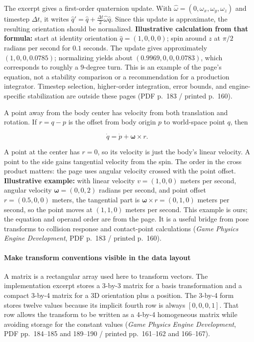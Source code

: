 The excerpt gives a first-order quaternion update. With \(\hat{\omega}=(0,\omega_x,\omega_y,\omega_z)\) and timestep \(\Delta t\), it writes \(\hat q' = \hat q + \frac{\Delta t}{2}\hat{\omega}\hat q\). Since this update is approximate, the resulting orientation should be normalized. \textbf{Illustrative calculation from that formula:} start at identity orientation \(\hat q=(1,0,0,0)\); spin around \(z\) at \(\pi/2\) radians per second for \(0.1\) seconds. The update gives approximately \((1,0,0,0.0785)\); normalizing yields about \((0.9969,0,0,0.0783)\), which corresponds to roughly a 9-degree turn. This is an example of the page's equation, not a stability comparison or a recommendation for a production integrator. Timestep selection, higher-order integration, error bounds, and engine-specific stabilization are outside these pages (PDF p.~183 / printed p.~160).

A point away from the body center has velocity from both translation and rotation. If \(r=q-p\) is the offset from body origin \(p\) to world-space point \(q\), then

\[
\dot q = \dot p + \boldsymbol{\omega} \times r.
\]

A point at the center has \(r=0\), so its velocity is just the body's linear velocity. A point to the side gains tangential velocity from the spin. The order in the cross product matters: the page uses angular velocity crossed with the point offset. \textbf{Illustrative example:} with linear velocity \(v=(1,0,0)\) meters per second, angular velocity \(\boldsymbol{\omega}=(0,0,2)\) radians per second, and point offset \(r=(0.5,0,0)\) meters, the tangential part is \(\boldsymbol{\omega}\times r=(0,1,0)\) meters per second, so the point moves at \((1,1,0)\) meters per second. This example is ours; the equation and operand order are from the page. It is a useful bridge from pose transforms to collision response and contact-point calculations (\emph{Game Physics Engine Development}, PDF p.~183 / printed p.~160).

\paragraph{Make transform conventions visible in the data layout}\label{06-engine-ii-ch025-make-transform-conventions-visible-in-the-data-layout}

A matrix is a rectangular array used here to transform vectors. The implementation excerpt stores a 3-by-3 matrix for a basis transformation and a compact 3-by-4 matrix for a 3D orientation plus a position. The 3-by-4 form stores twelve values because its implicit fourth row is always \([0,0,0,1]\). That row allows the transform to be written as a 4-by-4 homogeneous matrix while avoiding storage for the constant values (\emph{Game Physics Engine Development}, PDF pp.~184--185 and 189--190 / printed pp.~161--162 and 166--167).

